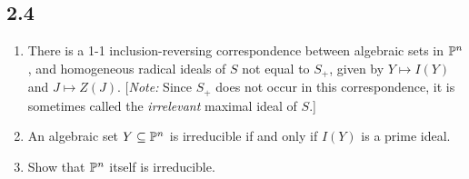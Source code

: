 \subsection*{2.4}

\begin{enumerate}
    \item There is a 1-1 inclusion-reversing correspondence between algebraic sets in $\P^n$, and homogeneous radical ideals of $S$ not equal to $S_+$, given by $Y \mapsto I(Y)$ and $J \mapsto Z(J)$. [\emph{Note:} Since $S_+$ does not occur in this correspondence, it is sometimes called the \emph{irrelevant} maximal ideal of $S$.]
    \item An algebraic set $Y \subseteq \P^n$ is irreducible if and only if $I(Y)$ is a prime ideal.
    \item Show that $\P^n$ itself is irreducible.
\end{enumerate}